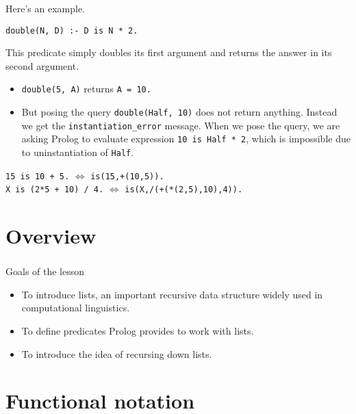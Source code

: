 \begin{frame}
	\frametitle{\insertsection}
	
	Here’s an example.
	
	\texttt{double(N, D) :- D is N * 2.}
	
	This predicate simply doubles its first argument and returns the answer in its second argument.
	
	\begin{itemize}
		\item \texttt{double(5, A)} returns \texttt{A = 10.}
		\item But posing the query \texttt{double(Half, 10)} does not return anything. Instead we get the \texttt{instantiation\_error} message. When we pose the query, we are asking Prolog
		to evaluate expression \texttt{10 is Half * 2}, which is impossible due to uninstantiation of \texttt{Half}.
	\end{itemize}
	
	\begin{example}
		\texttt{15 is 10 + 5.} \(\Leftrightarrow \) \texttt{is(15,+(10,5)).} \\
		\texttt{X is (2*5 + 10) / 4.} \(\Leftrightarrow \) \texttt{is(X,/(+(*(2,5),10),4)).}
	\end{example}
\end{frame}




\section{Overview}

\begin{frame}
	\frametitle{\insertsection}
	Goals of the lesson
	\begin{itemize}
		\item To introduce lists, an important recursive data structure widely used in computational linguistics.
		\item To define predicates Prolog provides to work with lists.
		\item To introduce the idea of recursing down lists.
	\end{itemize}
\end{frame}


\section{Functional notation}

